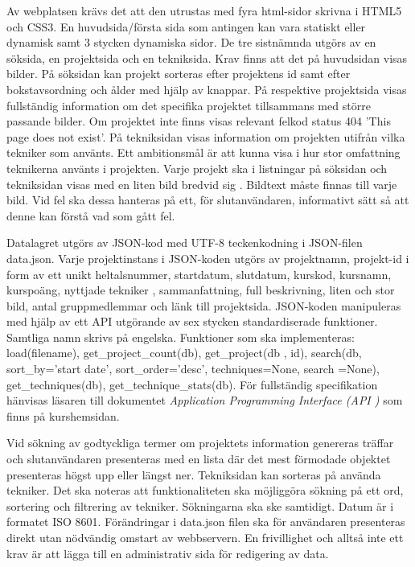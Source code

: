 \documentclass{TDP003mall}
\begin{document}
Av webplatsen krävs det att den utrustas med fyra html-sidor skrivna i HTML5 och
 CSS3. En huvudsida/första sida som antingen kan vara statiskt eller dynamisk samt
 3 stycken dynamiska sidor. De tre sistnämnda utgörs av en söksida, en projektsida
 och en tekniksida. Krav finns att det på huvudsidan visas bilder. På söksidan kan
 projekt sorteras efter projektens id samt efter bokstavsordning och ålder med hjälp av knappar.
 På respektive projektsida visas fullständig information om det specifika
 projektet tillsammans med större passande bilder. Om projektet inte finns visas
 relevant felkod status 404 'This page does not exist'. På tekniksidan visas
 information om projekten utifrån vilka tekniker som använts. Ett ambitionsmål är
 att kunna visa i hur stor omfattning teknikerna använts i projekten. Varje projekt
 ska i listningar på söksidan och tekniksidan visas med en liten bild bredvid sig
. Bildtext måste finnas till varje bild. Vid fel ska dessa hanteras på ett, för 
slutanvändaren, informativt sätt så att denne kan förstå vad som gått fel.

Datalagret utgörs av JSON-kod med UTF-8 teckenkodning i JSON-filen data.json. Varje
 projektinstans i JSON-koden utgörs av projektnamn, projekt-id i form av ett unikt
 heltalsnummer, startdatum, slutdatum, kurskod, kursnamn, kurspoäng, nyttjade tekniker
, sammanfattning, full beskrivning, liten och stor bild, antal gruppmedlemmar och
 länk till projektsida. JSON-koden manipuleras med hjälp av ett API utgörande av
 sex stycken standardiserade funktioner. Samtliga namn skrivs på engelska. Funktioner
 som ska implementeras: load(filename), get\_project\_count(db), get\_project(db
, id), search(db, sort\_by='start date', sort\_order='desc', techniques=None, search
=None), get\_techniques(db), get\_technique\_stats(db). För fullständig specifikation
 hänvisas läsaren till dokumentet \textit{Application Programming Interface (API
)} som finns på kurshemsidan.

Vid sökning av godtyckliga termer om projektets information genereras träffar och
 slutanvändaren presenteras med en lista där det mest förmodade objektet presenteras
 högst upp eller längst ner. Tekniksidan kan sorteras på använda tekniker. Det ska
 noteras att funktionaliteten ska möjliggöra sökning på ett ord, sortering och filtrering
 av tekniker. Sökningarna ska ske samtidigt. Datum är i formatet ISO 8601. Förändringar
 i data.json filen ska för användaren presenteras direkt utan nödvändig omstart av
 webbservern. En frivillighet och alltså inte ett krav är att lägga till en administrativ
 sida för redigering av data.
\end{document}

